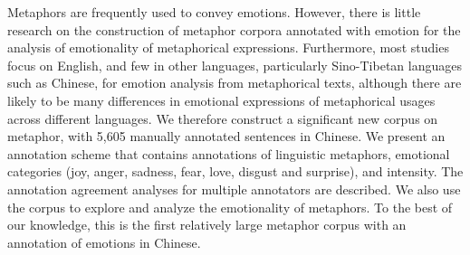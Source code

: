 Metaphors are frequently used to convey emotions. However, there is little research on the construction of metaphor corpora annotated with emotion for the analysis of emotionality of metaphorical expressions. Furthermore, most studies focus on English, and few in other languages, particularly Sino-Tibetan languages such as Chinese, for emotion analysis from metaphorical texts, although there are likely to be many differences in emotional expressions of metaphorical usages across different languages. We therefore construct a significant new corpus on metaphor, with 5,605 manually annotated sentences in Chinese. We present an annotation scheme that contains annotations of linguistic metaphors, emotional categories (joy, anger, sadness, fear, love, disgust and surprise), and intensity. The annotation agreement analyses for multiple annotators are described. We also use the corpus to explore and analyze the emotionality of metaphors. To the best of our knowledge, this is the first relatively large metaphor corpus with an annotation of emotions in Chinese.

